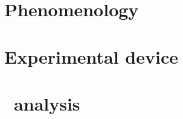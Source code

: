 \subsection*{}
\section{Phenomenology}


\subsection*{}
\section{Experimental device}

%

\subsection*{}
\section{\HAtoTauTau\ analysis}


\subsection*{}
